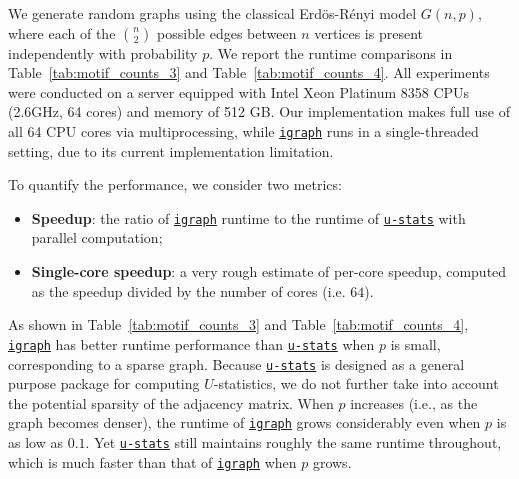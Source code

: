 \documentclass[letterpaper,11pt]{article}
\newcommand{\libref}[2]{\href{#2}{\texttt{#1}}}
\def\package{\libref{u-stats}{https://github.com/zrq1706/U-Statistics-Python}}
\def\igraph{\libref{igraph}{https://igraph.org/}}
\begin{document}
\begin{bibunit}[plainnat]
We generate random graphs using the classical Erd\"{o}s-R\'{e}nyi model $G (n, p)$, where each of the $\binom{n}{2}$ possible edges between $n$ vertices is present independently with probability $p$. We report the runtime comparisons in Table~\ref{tab:motif_counts_3} and Table~\ref{tab:motif_counts_4}. All experiments were conducted on a server equipped with Intel Xeon Platinum 8358 CPUs (2.6GHz, 64 cores) and memory of 512 GB. Our implementation makes full use of all 64 CPU cores via multiprocessing, while \igraph{} runs in a single-threaded setting, due to its current implementation limitation. 

To quantify the performance, we consider two metrics:
\begin{itemize}
\item \textbf{Speedup}: the ratio of \igraph{} runtime to the runtime of \package{} with parallel computation;
\item \textbf{Single-core speedup}: a very rough estimate of per-core speedup, computed as the speedup divided by the number of cores (i.e. $64$).
\end{itemize}

As shown in Table~\ref{tab:motif_counts_3} and Table~\ref{tab:motif_counts_4}, \igraph{} has better runtime performance than \package{} when $p$ is small, corresponding to a sparse graph. Because \package{} is designed as a general purpose package for computing $U$-statistics, we do not further take into account the potential sparsity of the adjacency matrix. When $p$ increases (i.e., as the graph becomes denser), the runtime of \igraph{} grows considerably even when $p$ is as low as $0.1$. Yet \package{} still maintains roughly the same runtime throughout, which is much faster than that of \igraph{} when $p$ grows.

\begin{figure}[ht]
    \centering


\end{figure}
\end{bibunit}
\end{document}
